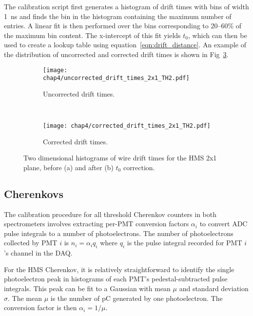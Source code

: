 The calibration script first generates a histogram of drift times with bins of
width \SI{1}{\nano\second}
and finds the bin in the histogram containing the maximum number of entries.
A linear fit is then performed over the bins corresponding to 20--60\% of the
maximum bin content.
The x-intercept of this fit yields $t_0$, which can then be used to create a
lookup table using equation~\ref{eqn:drift_distance}.
An example of the distribution of uncorrected and corrected drift times is
shown in Fig~\ref{fig:drift_th2s}.

\begin{figure}[ht]
    \centering
    \begin{subfigure}[b]{0.8\textwidth}
        \centering
        \texttt{[image: chap4/uncorrected\_drift\_times\_2x1\_TH2.pdf]}
        \caption{Uncorrected drift times.}
        \label{fig:uncorrected_drift_th2}
    \end{subfigure}
    \vspace{0.1cm}
    \\
    \begin{subfigure}[b]{0.8\textwidth}
        \centering
        \texttt{[image: chap4/corrected\_drift\_times\_2x1\_TH2.pdf]}
        \caption{Corrected drift times.}
        \label{fig:corrected_drift_th2}
    \end{subfigure}
    \caption[Two dimensional histograms of wire drift times for the HMS 2x1 plane,
             before and after $t_0$ correction.]{Two dimensional histograms of wire drift times for the HMS 2x1 plane,
             before (a) and after (b) $t_0$ correction.}
    \label{fig:drift_th2s}
\end{figure}


\subsection{Cherenkovs}

The calibration procedure for all threshold Cherenkov counters in both
spectrometers involves extracting per-PMT conversion factors $\alpha_i$ to
convert ADC pulse integrals to a number of photoelectrons.
The number of photoelectrons collected by PMT $i$ is $n_i=\alpha_iq_i$ where
$q_i$ is the pulse integral recorded for PMT $i$'s channel in the DAQ.


For the HMS Cherenkov, it is relatively straightforward to identify the single
photoelectron peak in histograms of each PMT's pedestal-subtracted pulse
integrals.
This peak can be fit to a Gaussian with mean $\mu$ and standard deviation
$\sigma$.
The mean $\mu$ is the number of \si{\pico\coulomb} generated by one
photoelectron.
The conversion factor is then $\alpha_i=1/\mu$.

